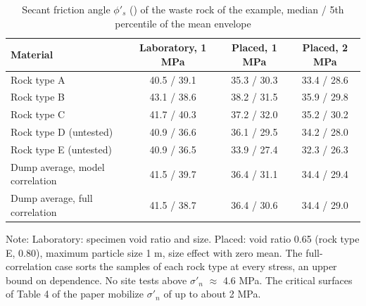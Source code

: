 \documentclass[Journal,letterpaper,InsideFigs,NoLists,NoLineNumbers]{ascelike-new}
\begin{document}
\begin{table}[htbp]
\caption{Secant friction angle $\phi'_s$ (\textdegree{}) of the waste rock of the example, median / 5th percentile of the mean envelope}
\centering\footnotesize
\renewcommand{\arraystretch}{1.2}
\setlength{\tabcolsep}{3.5pt}
\begin{tabular}{lccc}
\hline\hline
Material & Laboratory, 1 MPa & Placed, 1 MPa & Placed, 2 MPa \\
\hline
Rock type A & 40.5 / 39.1 & 35.3 / 30.3 & 33.4 / 28.6 \\
Rock type B & 43.1 / 38.6 & 38.2 / 31.5 & 35.9 / 29.8 \\
Rock type C & 41.7 / 40.3 & 37.2 / 32.0 & 35.2 / 30.2 \\
Rock type D (untested) & 40.9 / 36.6 & 36.1 / 29.5 & 34.2 / 28.0 \\
Rock type E (untested) & 40.9 / 36.5 & 33.9 / 27.4 & 32.3 / 26.3 \\
Dump average, model correlation & 41.5 / 39.7 & 36.4 / 31.1 & 34.4 / 29.4 \\
Dump average, full correlation & 41.5 / 38.7 & 36.4 / 30.6 & 34.4 / 29.0 \\
\hline\hline
\end{tabular}
\par\vspace{4pt}\parbox{\linewidth}{\footnotesize Note: Laboratory: specimen void ratio and size. Placed: void ratio 0.65 (rock type E, 0.80), maximum particle size 1 m, size effect with zero mean. The full-correlation case sorts the samples of each rock type at every stress, an upper bound on dependence. No site tests above $\sigma'_n$ $\approx$ 4.6 MPa. The critical surfaces of Table 4 of the paper mobilize $\sigma'_n$ of up to about 2 MPa.}
\end{table}
\end{document}
